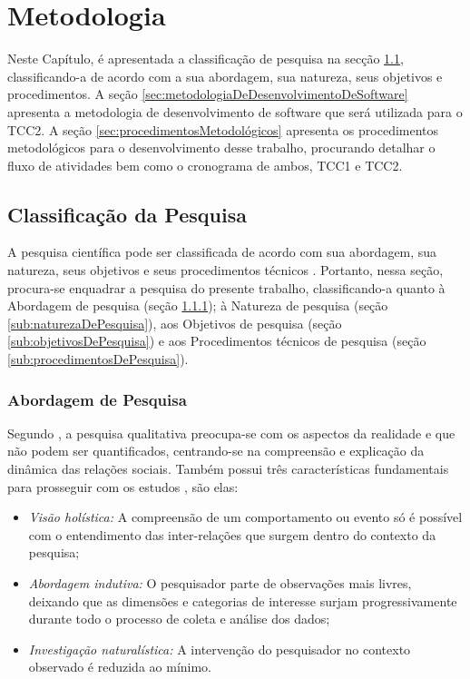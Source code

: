 \chapter{Metodologia}
\label{chap:metodologia}

Neste Capítulo, é apresentada a classificação de pesquisa na secção \ref{sec:classificacaoDaPesquisa}, classificando-a de acordo com a sua abordagem, sua natureza, seus objetivos e procedimentos. A seção \ref{sec:metodologiaDeDesenvolvimentoDeSoftware} apresenta a metodologia de desenvolvimento de software que será utilizada para o TCC2. A seção \ref{sec:procedimentosMetodológicos} apresenta os procedimentos metodológicos para o desenvolvimento desse trabalho, procurando detalhar o fluxo de atividades bem como o cronograma de ambos, TCC1 e TCC2.  

\section{Classificação da Pesquisa}
\label{sec:classificacaoDaPesquisa}

A pesquisa científica pode ser classificada de acordo com sua abordagem, sua natureza, seus objetivos e seus procedimentos técnicos \cite{gerhardt2009metodos}. Portanto, nessa seção, procura-se enquadrar a pesquisa do presente trabalho, classificando-a quanto à Abordagem de pesquisa (seção \ref{sub:abordagemDePesquisa}); à Natureza de pesquisa (seção \ref{sub:naturezaDePesquisa}), aos Objetivos de pesquisa (seção \ref{sub:objetivosDePesquisa}) e aos Procedimentos técnicos de pesquisa (seção \ref{sub:procedimentosDePesquisa}).

\subsection{Abordagem de Pesquisa}
\label{sub:abordagemDePesquisa}

Segundo \cite{gerhardt2009metodos}, a pesquisa qualitativa preocupa-se com os aspectos da realidade e que não podem ser quantificados, centrando-se na compreensão e explicação da dinâmica das relações sociais. Também possui três características fundamentais para prosseguir com os estudos \cite{mazzotti1991planejamento}, são elas:

\begin{itemize}
	\item \textit{Visão holística:} A compreensão de um comportamento ou evento só é possível com o entendimento das inter-relações que surgem dentro do contexto da pesquisa;
	\item \textit{Abordagem indutiva:} O pesquisador parte de observações mais livres, deixando que as dimensões e categorias de interesse surjam progressivamente durante todo o processo de coleta e análise dos dados;
	\item \textit{Investigação naturalística:} A intervenção do pesquisador no contexto observado é reduzida ao mínimo.
\end{itemize}

